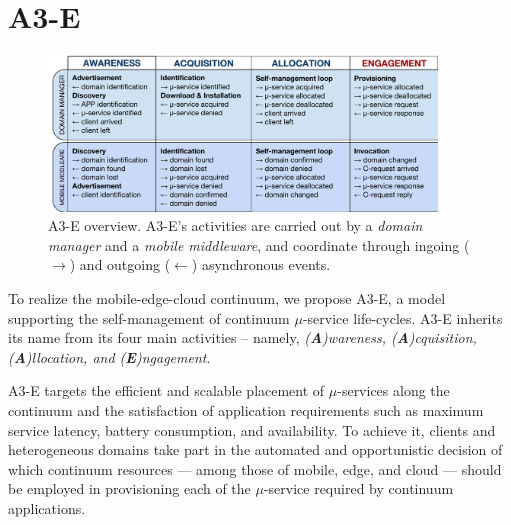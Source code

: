 \section{A3-E}\label{sec:A3-E}

\begin{figure}[tbp]
	\includegraphics[width=0.92\textwidth]{figs/A3-E-process}
	\caption{A3-E overview. A3-E's activities are carried out by a \textit{domain manager} and a \textit{mobile middleware}, and coordinate through ingoing ($\rightarrow$) and outgoing ($\leftarrow$) asynchronous events.}
	\label{fig:A3-E-process}
\end{figure}


To realize the mobile-edge-cloud continuum, we propose A3-E, a model supporting the self-management of continuum $\mu$-service life-cycles. A3-E inherits its name from its four main activities -- namely, \textit{(\textbf{A})wareness, (\textbf{A})cquisition, (\textbf{A})llocation, and (\textbf{E})ngagement}. 

A3-E targets 
the efficient and scalable placement of $\mu$-services along the continuum and the satisfaction of application requirements such as maximum service latency, battery consumption, and availability. 
To achieve it, clients and heterogeneous domains take part in the automated and opportunistic decision of which continuum resources --- among those of mobile, edge, and cloud --- should be employed in provisioning each of the $\mu$-service required by continuum applications. 



